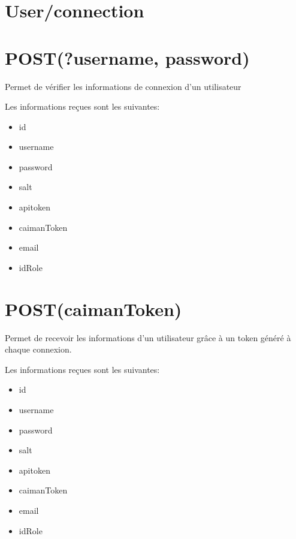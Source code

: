 \documentclass[a4paper,12pt,french]{sphinxmanual}
\begin{document}
\section{User/connection}
\label{\detokenize{fonctionnelleAPI:user-connection}}

\section{POST(?username, password)}
\label{\detokenize{fonctionnelleAPI:post-username-password}}
\sphinxAtStartPar
Permet de vérifier les informations de connexion d’un utilisateur

\sphinxAtStartPar
Les informations reçues sont les suivantes:
\begin{itemize}
\item {} 
\sphinxAtStartPar
id

\item {} 
\sphinxAtStartPar
username

\item {} 
\sphinxAtStartPar
password

\item {} 
\sphinxAtStartPar
salt

\item {} 
\sphinxAtStartPar
apitoken

\item {} 
\sphinxAtStartPar
caimanToken

\item {} 
\sphinxAtStartPar
email

\item {} 
\sphinxAtStartPar
idRole

\end{itemize}


\section{POST(caimanToken)}
\label{\detokenize{fonctionnelleAPI:post-caimantoken}}
\sphinxAtStartPar
Permet de recevoir les informations d’un utilisateur grâce à un token généré à chaque connexion.

\sphinxAtStartPar
Les informations reçues sont les suivantes:
\begin{itemize}
\item {} 
\sphinxAtStartPar
id

\item {} 
\sphinxAtStartPar
username

\item {} 
\sphinxAtStartPar
password

\item {} 
\sphinxAtStartPar
salt

\item {} 
\sphinxAtStartPar
apitoken

\item {} 
\sphinxAtStartPar
caimanToken

\item {} 
\sphinxAtStartPar
email

\item {} 
\sphinxAtStartPar
idRole

\end{itemize}
\end{document}
